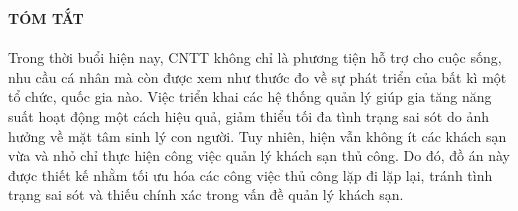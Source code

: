 	\begin{center}
		\fontsize{16}{20}\selectfont
		\textbf{TÓM TẮT\\} 
	\end{center}
	\fontsize{13}{13}\selectfont
	\paragraph{}
	Trong thời buổi hiện nay, CNTT không chỉ là phương tiện hỗ  trợ cho cuộc sống, nhu cầu cá nhân mà còn được xem như thước đo về sự phát triển của bất kì một tổ chức, quốc gia nào. Việc triển khai các hệ thống quản lý giúp gia tăng năng suất hoạt động một cách hiệu quả, giảm thiểu  tối đa tình trạng sai sót do ảnh hưởng về mặt tâm sinh lý con người. Tuy nhiên, hiện vẫn không ít các khách sạn vừa và nhỏ chỉ thực hiện công việc quản lý khách sạn thủ công. Do đó, đồ án này được thiết kế nhằm tối ưu hóa các công việc thủ công lặp đi lặp lại, tránh tình trạng sai sót và thiếu chính xác trong vấn đề quản lý khách sạn.
	
	\pagebreak
	